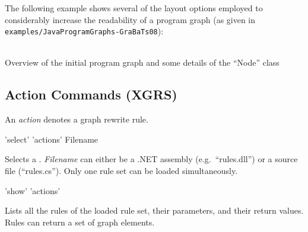 The following example shows several of the layout options employed to considerably increase the readability of a program graph (as given in \texttt{examples/JavaProgramGraphs-GraBaTs08}):
\begin{center}
    \hfill {}\\
  {\small Overview of the initial program graph and some details of the ``Node'' class}
\end{center}


\subsection{Action Commands (XGRS)}
\label{grsthings}
An \emph{action} denotes a graph rewrite rule.

\begin{rail}
  'select' 'actions' Filename
\end{rail}
Selects a .
\emph{Filename} can either be a .NET assembly (e.g.\ ``rules.dll'') or a source file (``rules.cs'').
Only one rule set can be loaded simultaneously.

\begin{rail}
  'show' 'actions'
\end{rail}
Lists all the rules of the loaded rule set, their parameters, and their return values.
Rules can return a set of graph elements.

